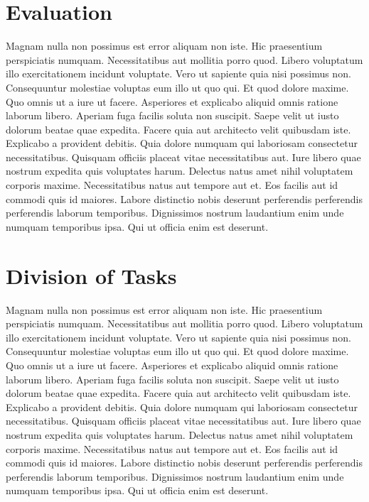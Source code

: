\documentclass{acmsiggraph}
\begin{document}
\section{Evaluation}
\label{sec:intro}

Magnam nulla non possimus est error aliquam non iste. Hic praesentium perspiciatis numquam. Necessitatibus aut mollitia porro quod. Libero voluptatum illo exercitationem incidunt voluptate. Vero ut sapiente quia nisi possimus non. Consequuntur molestiae voluptas eum illo ut quo qui.
Et quod dolore maxime. Quo omnis ut a iure ut facere. Asperiores et explicabo aliquid omnis ratione laborum libero. Aperiam fuga facilis soluta non suscipit.
Saepe velit ut iusto dolorum beatae quae expedita. Facere quia aut architecto velit quibusdam iste. Explicabo a provident debitis. Quia dolore numquam qui laboriosam consectetur necessitatibus.
Quisquam officiis placeat vitae necessitatibus aut. Iure libero quae nostrum expedita quis voluptates harum. Delectus natus amet nihil voluptatem corporis maxime. Necessitatibus natus aut tempore aut et.
Eos facilis aut id commodi quis id maiores. Labore distinctio nobis deserunt perferendis perferendis perferendis laborum temporibus. Dignissimos nostrum laudantium enim unde numquam temporibus ipsa. Qui ut officia enim est deserunt.


\section{Division of Tasks}
\label{sec:intro}

Magnam nulla non possimus est error aliquam non iste. Hic praesentium perspiciatis numquam. Necessitatibus aut mollitia porro quod. Libero voluptatum illo exercitationem incidunt voluptate. Vero ut sapiente quia nisi possimus non. Consequuntur molestiae voluptas eum illo ut quo qui.
Et quod dolore maxime. Quo omnis ut a iure ut facere. Asperiores et explicabo aliquid omnis ratione laborum libero. Aperiam fuga facilis soluta non suscipit.
Saepe velit ut iusto dolorum beatae quae expedita. Facere quia aut architecto velit quibusdam iste. Explicabo a provident debitis. Quia dolore numquam qui laboriosam consectetur necessitatibus.
Quisquam officiis placeat vitae necessitatibus aut. Iure libero quae nostrum expedita quis voluptates harum. Delectus natus amet nihil voluptatem corporis maxime. Necessitatibus natus aut tempore aut et.
Eos facilis aut id commodi quis id maiores. Labore distinctio nobis deserunt perferendis perferendis perferendis laborum temporibus. Dignissimos nostrum laudantium enim unde numquam temporibus ipsa. Qui ut officia enim est deserunt.
\end{document}

